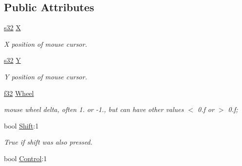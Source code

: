 \subsection*{Public Attributes}
\begin{DoxyCompactItemize}
\item 
\hyperlink{namespaceirr_ac66849b7a6ed16e30ebede579f9b47c6}{s32} \hyperlink{structirr_1_1SEvent_1_1SMouseInput_a8d1f2d8281cc8982eff089b580f58e86}{X}\hypertarget{structirr_1_1SEvent_1_1SMouseInput_a8d1f2d8281cc8982eff089b580f58e86}{}\label{structirr_1_1SEvent_1_1SMouseInput_a8d1f2d8281cc8982eff089b580f58e86}

\begin{DoxyCompactList}\small\item\em X position of mouse cursor. \end{DoxyCompactList}\item 
\hyperlink{namespaceirr_ac66849b7a6ed16e30ebede579f9b47c6}{s32} \hyperlink{structirr_1_1SEvent_1_1SMouseInput_a274d984da2c05655589bd13c4e71e5a3}{Y}\hypertarget{structirr_1_1SEvent_1_1SMouseInput_a274d984da2c05655589bd13c4e71e5a3}{}\label{structirr_1_1SEvent_1_1SMouseInput_a274d984da2c05655589bd13c4e71e5a3}

\begin{DoxyCompactList}\small\item\em Y position of mouse cursor. \end{DoxyCompactList}\item 
\hyperlink{namespaceirr_a0277be98d67dc26ff93b1a6a1d086b07}{f32} \hyperlink{structirr_1_1SEvent_1_1SMouseInput_a0821c616196a7ffcc574e68c060b6d18}{Wheel}
\begin{DoxyCompactList}\small\item\em mouse wheel delta, often 1. or -\/1., but can have other values $<$ 0.\+f or $>$ 0.\+f; \end{DoxyCompactList}\item 
bool \hyperlink{structirr_1_1SEvent_1_1SMouseInput_afa1f5dca47f1378ccc27157ba225feda}{Shift}\+:1\hypertarget{structirr_1_1SEvent_1_1SMouseInput_afa1f5dca47f1378ccc27157ba225feda}{}\label{structirr_1_1SEvent_1_1SMouseInput_afa1f5dca47f1378ccc27157ba225feda}

\begin{DoxyCompactList}\small\item\em True if shift was also pressed. \end{DoxyCompactList}\item 
bool \hyperlink{structirr_1_1SEvent_1_1SMouseInput_a2b0cf7a5d52c4489dbfc739fe62aa354}{Control}\+:1\hypertarget{structirr_1_1SEvent_1_1SMouseInput_a2b0cf7a5d52c4489dbfc739fe62aa354}{}\label{structirr_1_1SEvent_1_1SMouseInput_a2b0cf7a5d52c4489dbfc739fe62aa354}


\end{DoxyCompactItemize}
